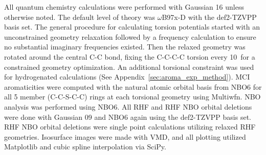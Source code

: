 All quantum chemistry calculations were performed with Gaussian 16 unless otherwise noted.\cite{g16} The default level of theory was $\omega$B97x-D with the def2-TZVPP basis set.\cite{Chai2008, Weigend2005} The general procedure for calculating torsion potentials started with an unconstrained geometry relaxation followed by a frequency calculation to ensure no substantial imaginary frequencies existed. Then the relaxed geometry was rotated around the central C-C bond, fixing the C-C-C-C torsion every 10\textdegree \ for a constrained geometry optimization. An additional torsional constraint was used for hydrogenated calculations (See Appendix~\ref{sec:aroma_exp_method}). MCI aromaticities were computed with the natural atomic orbital basis from NBO6 for all 5 member (C-C-S-C-C) rings at each torsional geometry using Multiwfn.\cite{Lu2012} NBO analysis was performed using NBO6.\cite{NBO6} All RHF and RHF NBO orbital deletions were done with Gaussian 09\cite{g09} and NBO6 again using the def2-TZVPP basis set. RHF NBO orbital deletions were single point calculations utilizing relaxed RHF geometries. Isosurface images were made with VMD,\cite{HUMP96} and all plotting utilized Matplotlib and cubic spline interpolation via SciPy.\cite{Jones}
